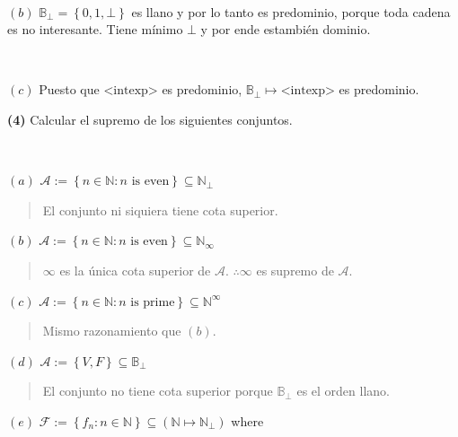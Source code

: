 \documentclass[a4paper, 12pt]{article}
\begin{document}
~


$(b)$ $\mathbb{B}_\bot = \left\{ 0,1, \bot  \right\} $ es llano y por lo tanto
es predominio, porque toda cadena es no interesante. Tiene mínimo $\bot$ y por
ende estambién dominio.

~

$(c)$ Puesto que $\text{<intexp>}$ es predominio,
$\mathbb{B}_\bot \mapsto \text{<intexp>}$ es predominio.


\pagebreak 

\begin{myframe}
\textbf{(4)} Calcular el supremo de los siguientes conjuntos.
\end{myframe}

~ 

$(a)$ $\mathcal{A} := \left\{ n \in \mathbb{N} : n \text{ is even} \right\}
\subseteq \mathbb{N}_{\bot} $


\small
\begin{quote}

  El conjunto ni siquiera tiene cota superior. 

\end{quote}
\normalsize

$(b)$ $\mathcal{A} := \left\{ n \in \mathbb{N} : n \text{ is even} \right\}
\subseteq \mathbb{N}_{\infty} $


\small
\begin{quote}

$\infty $ es la única cota superior de $\mathcal{A}$. $\therefore \infty$ es
supremo de $\mathcal{A}$.

\end{quote}
\normalsize


$(c)$ $\mathcal{A} := \left\{ n \in \mathbb{N} : n \text{ is prime} \right\}
\subseteq \mathbb{N}^\infty$


\small
\begin{quote}

Mismo razonamiento que $(b)$.

\end{quote}
\normalsize


$(d)$ $\mathcal{A} := \left\{ V, F \right\} \subseteq \mathbb{B}_\bot$


\small
\begin{quote}

El conjunto no tiene cota superior porque $\mathbb{B}_\bot $ es el orden llano.

\end{quote}
\normalsize


$(e)$ $\mathcal{F} := \left\{ f_n : n \in \mathbb{N} \right\} \subseteq
\left( \mathbb{N} \mapsto \mathbb{N}_\bot  \right) $ where 
\end{document}
